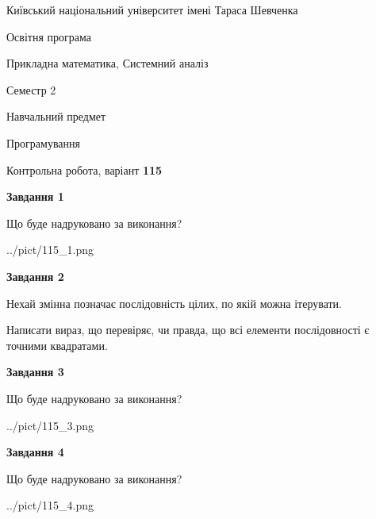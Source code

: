 \documentclass[12pt, ukrainian]{article}
\begin{document}
{{\begin {small}\par
{ \center  Київський національний університет імені Тараса Шевченка \par}
{\parbox {5 cm}{Освітня програма \hfill}{\parbox {8 cm}{Прикладна математика, Системний аналіз \hfill}}\parbox {5 cm}{\hfill Семестр 2}}\par
{\parbox {5 cm} {Навчальний предмет \hfill}\parbox {7 cm}{Програмування \hfill}\parbox {6cm}{\hfill}\par}\vspace{-7pt} \end{small}}{\center Контрольна робота, варіант  \No \textbf
{ 115 }\par}}
{
\begin {large}
{\begin {center}\textbf{Завдання 1}\end {center}}\par
Що буде надруковано за виконання?\par\par
\begin{center}
	{../pict/115_1.png}
\end{center}
\newpage

{\begin {center}\textbf{Завдання 2}\end {center}}\par
Нехай змінна  позначає послідовність цілих, по якій можна ітерувати.

Написати вираз, що перевіряє, чи правда, що всі елементи послідовності є точними квадратами.\par
\newpage

{\begin {center}\textbf{Завдання 3}\end {center}}\par
Що буде надруковано за виконання?
\begin{center}
	{../pict/115_3.png}
\end{center}
\newpage

{\begin {center}\textbf{Завдання 4}\end {center}}\par
Що буде надруковано за виконання?\par
\begin{center}
	{../pict/115_4.png}
\end{center}
\newpage


\end{large}}
\end{document}
